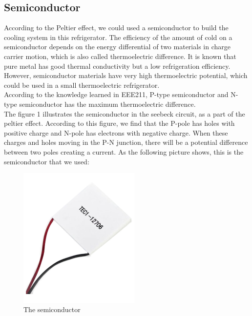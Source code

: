 \documentclass[12pt,onecolumn]{article}
\begin{document}
\subsection{Semiconductor}
According to the Peltier effect, we could used a semiconductor to build the cooling system in this refrigerator. The efficiency of the amount of cold on a semiconductor depends on the energy differential of two materials in charge carrier motion, which is also called thermoelectric difference. It is known that pure metal has good thermal conductivity but a low refrigeration efficiency. However, semiconductor materials have very high thermoelectric potential, which could be used in a small thermoelectric refrigerator.\\
According to the knowledge learned in EEE211, P-type semiconductor and N-type semiconductor has the maximum thermoelectric difference.\\
The figure 1 illustrates the semiconductor in the seebeck circuit, as a part of the peltier effect. According to this figure, we find that the P-pole has holes with positive charge and N-pole has electrons with negative charge. When these charges and holes moving in the P-N junction, there will be a potential difference between two poles creating a current. 
As the following picture shows, this is the semiconductor that we used:
\begin{figure}[H]
\centering
\includegraphics[width=6cm]{semiconductor}
\caption{The semiconductor}
\end{figure}
\end{document}
